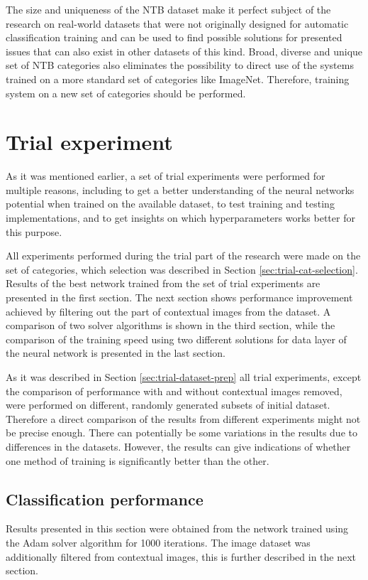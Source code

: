 The size and uniqueness of the NTB dataset make it perfect subject of the research on real-world datasets that were not originally designed for automatic classification training and can be used to find possible solutions for presented issues that can also exist in other datasets of this kind. Broad, diverse and unique set of NTB categories also eliminates the possibility to direct use of the systems trained on a more standard set of categories like ImageNet. Therefore, training system on a new set of categories should be performed.


\section{Trial experiment}
As it was mentioned earlier, a set of trial experiments were performed for multiple reasons, including to get a better understanding of the neural networks potential when trained on the available dataset, to test training and testing implementations, and to get insights on which hyperparameters works better for this purpose.

All experiments performed during the trial part of the research were made on the set of categories, which selection was described in Section \ref{sec:trial-cat-selection}. Results of the best network trained from the set of trial experiments are presented in the first section. The next section shows performance improvement achieved by filtering out the part of contextual images from the dataset. A comparison of two solver algorithms is shown in the third section, while the comparison of the training speed using two different solutions for data layer of the neural network is presented in the last section.

As it was described in Section \ref{sec:trial-dataset-prep} all trial experiments, except the comparison of performance with and without contextual images removed, were performed on different, randomly generated subsets of initial dataset. Therefore a direct comparison of the results from different experiments might not be precise enough. There can potentially be some variations in the results due to differences in the datasets. However, the results can give indications of whether one method of training is significantly better than the other.

\subsection{Classification performance}
    Results presented in this section were obtained from the network trained using the Adam solver algorithm for 1000 iterations. The image dataset was additionally filtered from contextual images, this is further described in the next section.
    
